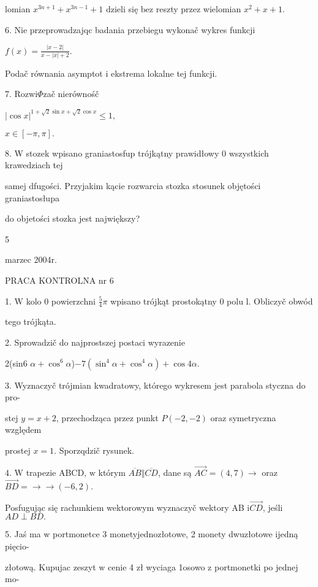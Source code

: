 \documentclass[a4paper,12pt]{article}
\begin{document}
lomian $x^{3n+1}+x^{3n-1}+1$ dzieli się $\mathrm{b}\mathrm{e}\mathrm{z}$ reszty przez wielomian $x^{2}+x+1.$

6. Nie przeprowadzajqc badania przebiegu wykonač wykres funkcji

$f(x)=\displaystyle \frac{|x-2|}{x-|x|+2}.$

Podač równania asymptot i ekstrema lokalne tej funkcji.

7. Rozwi$\Phi$zač nierównośč

$|\cos x|^{1+\sqrt{2}\sin x+\sqrt{2}\cos x}\leq 1,$

$x\in[-\pi,\pi].$

8. W stozek wpisano graniastosfup trójkątny prawidłowy 0 wszystkich krawedziach tej

samej dfugości. Przyjakim kącie rozwarcia stozka stosunek objętości graniastosłupa

do objetości stozka jest największy?

5





marzec 2004r.

PRACA KONTROLNA nr 6

1. $\mathrm{W}$ kolo $0$ powierzchni $\displaystyle \frac{5}{4}\pi$ wpisano trójkąt prostokątny $0$ polu l. Obliczyč obwód

tego trójkąta.

2. Sprowadzič do najprostszej postaci wyrazenie

2(sin6 $\alpha+\cos^{6}\alpha$)$-7(\sin^{4}\alpha+\cos^{4}\alpha)+\cos 4\alpha.$

3. Wyznaczyč trójmian kwadratowy, którego wykresem jest parabola styczna do pro-

stej $y=x+2$, przechodząca przez punkt $P(-2,-2)$ oraz symetryczna względem

prostej $x=1$. Sporzqdzič rysunek.

4. $\mathrm{W}$ trapezie ABCD, $\mathrm{w}$ którym $\overline{AB}\Vert\overline{CD}$, dane są $\vec{AC}=(4,7)\rightarrow$ oraz $\vec{BD}=\rightarrow\rightarrow(-6,2).$

Posfugując się rachunkiem wektorowym wyznaczyč wektory AB $\mathrm{i}\vec{CD}$, jeśli $AD\perp BD.$

5. Jaś ma $\mathrm{w}$ portmonetce 3 monetyjednozłotowe, 2 monety dwuzłotowe ijedną pięcio-

złotową. Kupujac zeszyt $\mathrm{w}$ cenie 4 zł wyciaga 1osowo $\mathrm{z}$ portmonetki po jednej mo-
\end{document}

